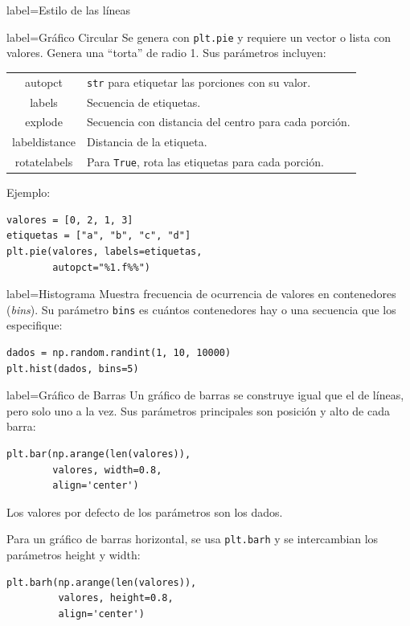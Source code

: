 \documentclass[10pt]{article}
\begin{document}
\begin{multicols*}{3}
\begin{contentbox}{label=Estilo de las líneas}
\end{contentbox}

\begin{contentbox}{label=Gráfico Circular}
    Se genera con \lstinline!plt.pie! y requiere un vector o lista con valores. Genera una ``torta'' de radio 1. Sus parámetros incluyen:

    \begin{tabular}{C|p{0.5\textwidth}}
        autopct & \lstinline!str! para etiquetar las porciones con su valor. \\
        labels & Secuencia de etiquetas. \\
        explode & Secuencia con distancia del centro para cada porción. \\
        labeldistance & Distancia de la etiqueta. \\
        rotatelabels & Para \lstinline!True!, rota las etiquetas para cada porción.
    \end{tabular}
    
    Ejemplo:
\begin{lstlisting}
valores = [0, 2, 1, 3]
etiquetas = ["a", "b", "c", "d"]
plt.pie(valores, labels=etiquetas,
        autopct="%1.f%%")
\end{lstlisting}
\end{contentbox}

\begin{contentbox}{label=Histograma}
    Muestra frecuencia de ocurrencia de valores en contenedores (\textit{bins}). Su parámetro \lstinline!bins! es cuántos contenedores hay o una secuencia que los especifique:
    
\begin{lstlisting}
dados = np.random.randint(1, 10, 10000)
plt.hist(dados, bins=5)
\end{lstlisting}

\end{contentbox}

\begin{contentbox}{label=Gráfico de Barras}
    Un gráfico de barras se construye igual que el de líneas, pero solo uno a la vez. Sus parámetros principales son posición y alto de cada barra:
\begin{lstlisting}
plt.bar(np.arange(len(valores)),
        valores, width=0.8,
        align='center')
\end{lstlisting}

    Los valores por defecto de los parámetros son los dados.
    
    Para un gráfico de barras horizontal, se usa \lstinline!plt.barh! y se intercambian los parámetros height y width:
\begin{lstlisting}
plt.barh(np.arange(len(valores)),
         valores, height=0.8,
         align='center')
\end{lstlisting}
\end{contentbox}


\end{multicols*}
\end{document}
